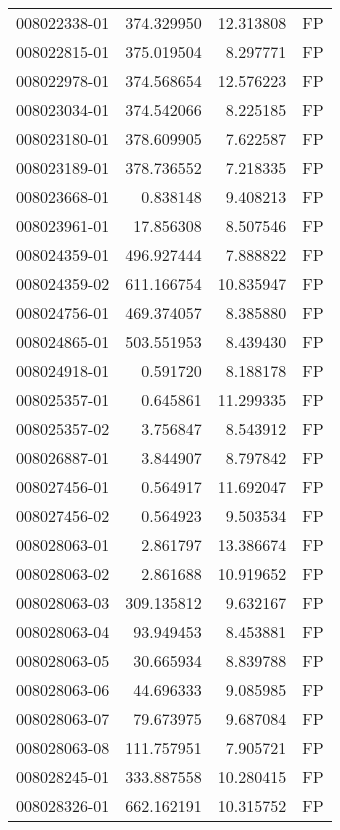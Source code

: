 \begin{tabular}{lrrl}
008022338-01 &  374.329950 &      12.313808 &   FP \\
008022815-01 &  375.019504 &       8.297771 &   FP \\
008022978-01 &  374.568654 &      12.576223 &   FP \\
008023034-01 &  374.542066 &       8.225185 &   FP \\
008023180-01 &  378.609905 &       7.622587 &   FP \\
008023189-01 &  378.736552 &       7.218335 &   FP \\
008023668-01 &    0.838148 &       9.408213 &   FP \\
008023961-01 &   17.856308 &       8.507546 &   FP \\
008024359-01 &  496.927444 &       7.888822 &   FP \\
008024359-02 &  611.166754 &      10.835947 &   FP \\
008024756-01 &  469.374057 &       8.385880 &   FP \\
008024865-01 &  503.551953 &       8.439430 &   FP \\
008024918-01 &    0.591720 &       8.188178 &   FP \\
008025357-01 &    0.645861 &      11.299335 &   FP \\
008025357-02 &    3.756847 &       8.543912 &   FP \\
008026887-01 &    3.844907 &       8.797842 &   FP \\
008027456-01 &    0.564917 &      11.692047 &   FP \\
008027456-02 &    0.564923 &       9.503534 &   FP \\
008028063-01 &    2.861797 &      13.386674 &   FP \\
008028063-02 &    2.861688 &      10.919652 &   FP \\
008028063-03 &  309.135812 &       9.632167 &   FP \\
008028063-04 &   93.949453 &       8.453881 &   FP \\
008028063-05 &   30.665934 &       8.839788 &   FP \\
008028063-06 &   44.696333 &       9.085985 &   FP \\
008028063-07 &   79.673975 &       9.687084 &   FP \\
008028063-08 &  111.757951 &       7.905721 &   FP \\
008028245-01 &  333.887558 &      10.280415 &   FP \\
008028326-01 &  662.162191 &      10.315752 &   FP \\

\end{tabular}
